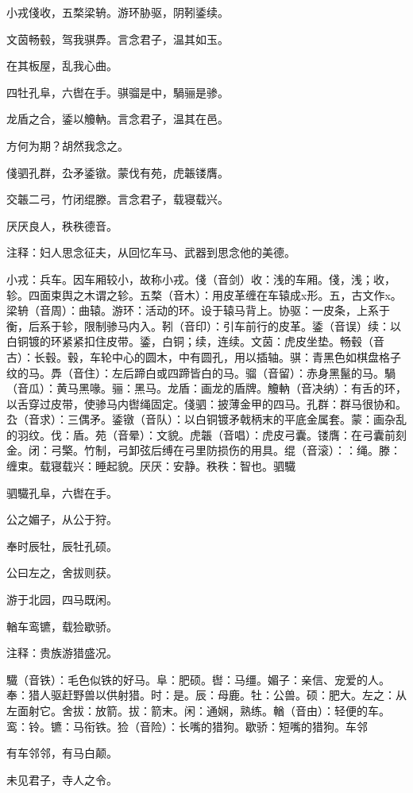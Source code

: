 \documentclass[12pt,UTF8]{ctexbook}
\begin{document}
小戎俴收，五楘梁辀。游环胁驱，阴靷鋈续。

文茵畅毂，驾我骐馵。言念君子，温其如玉。

在其板屋，乱我心曲。

四牡孔阜，六辔在手。骐骝是中，騧骊是骖。

龙盾之合，鋈以觼軜。言念君子，温其在邑。

方何为期？胡然我念之。

俴驷孔群，厹矛鋈镦。蒙伐有苑，虎韔镂膺。

交韔二弓，竹闭绲滕。言念君子，载寝载兴。

厌厌良人，秩秩德音。

注释：妇人思念征夫，从回忆车马、武器到思念他的美德。

小戎：兵车。因车厢较小，故称小戎。俴（音剑）收：浅的车厢。俴，浅；收，轸。四面束舆之木谓之轸。五楘（音木）：用皮革缠在车辕成x形。五，古文作x。梁辀（音周）：曲辕。游环：活动的环。设于辕马背上。协驱：一皮条，上系于衡，后系于轸，限制骖马内入。靷（音印）：引车前行的皮革。鋈（音误）续：以白铜镀的环紧紧扣住皮带。鋈，白铜；续，连续。文茵：虎皮坐垫。畅毂（音古）：长毂。毂，车轮中心的圆木，中有圆孔，用以插轴。骐：青黑色如棋盘格子纹的马。馵（音住）：左后蹄白或四蹄皆白的马。骝（音留）：赤身黑鬣的马。騧（音瓜）：黄马黑喙。骊：黑马。龙盾：画龙的盾牌。觼軜（音决纳）：有舌的环，以舌穿过皮带，使骖马内辔绳固定。俴驷：披薄金甲的四马。孔群：群马很协和。厹（音求）：三偶矛。鋈镦（音队）：以白铜镀矛戟柄末的平底金属套。蒙：画杂乱的羽纹。伐：盾。苑（音晕）：文貌。虎韔（音唱）：虎皮弓囊。镂膺：在弓囊前刻金。闭：弓檠。竹制，弓卸弦后缚在弓里防损伤的用具。绲（音滚）：：绳。滕：缠束。载寝载兴：睡起貌。厌厌：安静。秩秩：智也。驷驖

驷驖孔阜，六辔在手。

公之媚子，从公于狩。

奉时辰牡，辰牡孔硕。

公曰左之，舍拔则获。

游于北园，四马既闲。

輶车鸾镳，载猃歇骄。

注释：贵族游猎盛况。

驖（音铁）：毛色似铁的好马。阜：肥硕。辔：马缰。媚子：亲信、宠爱的人。奉：猎人驱赶野兽以供射猎。时：是。辰：母鹿。牡：公兽。硕：肥大。左之：从左面射它。舍拔：放箭。拔：箭末。闲：通娴，熟练。輶（音由）：轻便的车。鸾：铃。镳：马衔铁。猃（音险）：长嘴的猎狗。歇骄：短嘴的猎狗。车邻

有车邻邻，有马白颠。

未见君子，寺人之令。
\end{document}
